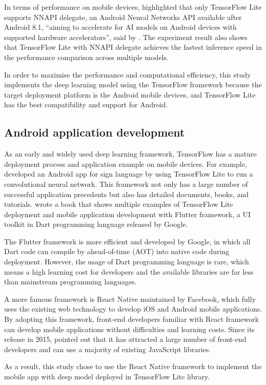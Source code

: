In terms of performance on mobile devices, \citet{luo2020comparison} highlighted that only TensorFlow Lite supports NNAPI delegate, an Android Neural Networks API available after Android 8.1, ``aiming to accelerate for AI models on Android devices with supported hardware accelerators'', said by \citet{luo2020comparison}.
The experiment result also shows that TensorFlow Lite with NNAPI delegate achieves the fastest inference speed in the performance comparison across multiple models.

In order to maximise the performance and computational efficiency, this study implements the deep learning model using the TensorFlow framework because the target deployment platform is the Android mobile devices, and TensorFlow Lite has the best compatibility and support for Android.

\subsection{Android application development}
As an early and widely used deep learning framework, TensorFlow has a mature deployment process and application example on mobile devices.
For example, \citet{fadlilah2021development} developed an Android app for sign language by using TensorFlow Lite to run a convolutional neural network.
This framework not only has a large number of successful application precedents but also has detailed documents, books, and tutorials.
\citet{singh2020mobile} wrote a book that shows multiple examples of TensorFlow Lite deployment and mobile application development with Flutter framework, a UI toolkit in Dart programming language released by Google.

The Flutter framework is more efficient and developed by Google, in which all Dart code can compile by ahead-of-time (AOT) into native code during deployment.
However, the usage of Dart programming language is rare, which means a high learning cost for developers and the available libraries are far less than mainstream programming languages.

A more famous framework is React Native maintained by Facebook, which fully uses the existing web technology to develop iOS and Android mobile applications.
By adopting this framework, front-end developers familiar with React framework can develop mobile applications without difficulties and learning costs.
Since its release in 2015, \citet{eisenman2015learning} pointed out that it has attracted a large number of front-end developers and can use a majority of existing JavaScript libraries.

As a result, this study chose to use the React Native framework to implement the mobile app with deep model deployed in TensorFlow Lite library.
